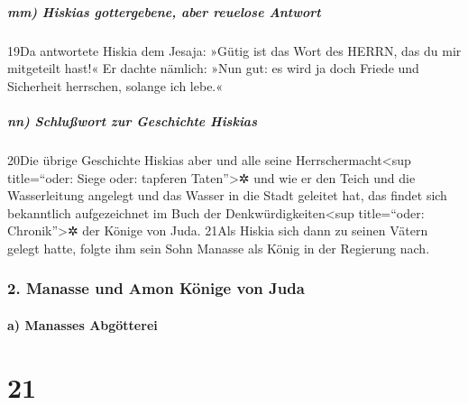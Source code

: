\hypertarget{mm-hiskias-gottergebene-aber-reuelose-antwort}{%
\subparagraph{mm) Hiskias gottergebene, aber reuelose
Antwort}\label{mm-hiskias-gottergebene-aber-reuelose-antwort}}

19Da antwortete Hiskia dem Jesaja: »Gütig ist das Wort des HERRN, das du
mir mitgeteilt hast!« Er dachte nämlich: »Nun gut: es wird ja doch
Friede und Sicherheit herrschen, solange ich lebe.«

\hypertarget{nn-schluuxdfwort-zur-geschichte-hiskias}{%
\subparagraph{nn) Schlußwort zur Geschichte
Hiskias}\label{nn-schluuxdfwort-zur-geschichte-hiskias}}

20Die übrige Geschichte Hiskias aber und alle seine
Herrschermacht\textless sup title=``oder: Siege oder: tapferen
Taten''\textgreater✲ und wie er den Teich und die Wasserleitung angelegt
und das Wasser in die Stadt geleitet hat, das findet sich bekanntlich
aufgezeichnet im Buch der Denkwürdigkeiten\textless sup title=``oder:
Chronik''\textgreater✲ der Könige von Juda. 21Als Hiskia sich dann zu
seinen Vätern gelegt hatte, folgte ihm sein Sohn Manasse als König in
der Regierung nach.

\hypertarget{manasse-und-amon-kuxf6nige-von-juda}{%
\subsubsection{2. Manasse und Amon Könige von
Juda}\label{manasse-und-amon-kuxf6nige-von-juda}}

\hypertarget{a-manasses-abguxf6tterei}{%
\paragraph{a) Manasses Abgötterei}\label{a-manasses-abguxf6tterei}}

\hypertarget{section-20}{%
\section{21}\label{section-20}}

